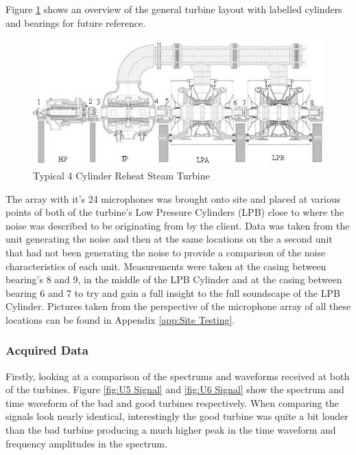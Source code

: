 \documentclass{UoNMCHA}
\numberwithin{equation}{section}
\begin{document}
    Figure \ref{fig:turbine} shows an overview of the general turbine layout with labelled cylinders and bearings for future reference.

    \begin{figure} [H]
        \centering
        \includegraphics[keepaspectratio, width = \textwidth]{Figures/LabelledTurbine.jpg}
        \caption{Typical 4 Cylinder Reheat Steam Turbine \citep{WWH}}
        \label{fig:turbine}
    \end{figure}


    The array with it's 24 microphones was brought onto site and placed at various points of both of the turbine's Low Pressure Cylinders (LPB) close to where the noise was described to be originating from by the client. Data was taken from the unit generating the noise and then at the same locations on the a second unit that had not been generating the noise to provide a comparison of the noise characteristics of each unit. Measurements were taken at the casing between bearing's 8 and 9, in the middle of the LPB Cylinder and at the casing between bearing 6 and 7 to try and gain a full insight to the full soundscape of the LPB Cylinder. Pictures taken from the perspective of the microphone array of all these locations can be found in Appendix \ref{app:Site Testing}.

    \subsubsection{Acquired Data} \label{sec:Site Acquired Data}

    Firstly, looking at a comparison of the spectrums and waveforms received at both of the turbines. Figure \ref{fig:U5 Signal} and \ref{fig:U6 Signal} show the spectrum and time waveform of the bad and good turbines respectively. When comparing the signals look nearly identical, interestingly the good turbine was quite a bit louder than the bad turbine producing a much higher peak in the time waveform and frequency amplitudes in the spectrum. 
\end{document}
